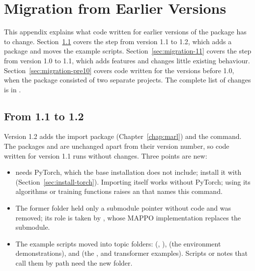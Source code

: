 \chapter{Migration from Earlier Versions}\label{app:migration}
\begingroup\setlength{\emergencystretch}{3em}%

This appendix explains what code written for earlier versions of the package
has to change. Section~\ref{sec:migration-12} covers the step from version 1.1
to 1.2, which adds a package and moves the example scripts.
Section~\ref{sec:migration-11} covers the step from version 1.0 to 1.1, which
adds features and changes little existing behaviour.
Section~\ref{sec:migration-pre10} covers code written for the versions before
1.0, when the package consisted of two separate projects. The complete list of
changes is in .

\section{From 1.1 to 1.2}\label{sec:migration-12}

Version 1.2 adds the import package 
(Chapter~\ref{chap:marl}) and the  command. The packages
 and  are unchanged apart from their version
number, so code written for version 1.1 runs without changes. Three points
are new:

\begin{itemize}
  \item {} needs PyTorch, which the base installation
  does not include; install it with 
  (Section~\ref{sec:install-torch}). Importing 
  itself works without PyTorch; using its algorithms or training functions
  raises an  that names this command.
  \item The former folder  held only a
  submodule pointer without code and was removed; its role is taken by
  , whose MAPPO implementation replaces the
   submodule.
  \item The example scripts moved into topic folders:
   (,
  ),  (the environment
  demonstrations),  and 
  (the ,  and transformer examples). Scripts or
  notes that call them by path need the new folder.
\end{itemize}

